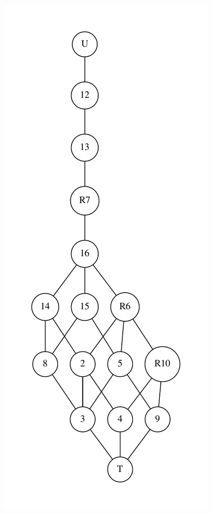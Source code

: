 \begin{figure}[p]
  \centering
  \singlespacing
  \includegraphics[scale=0.6]{pics/ch-motzkin/p3-lattice.pdf}

\end{figure}
